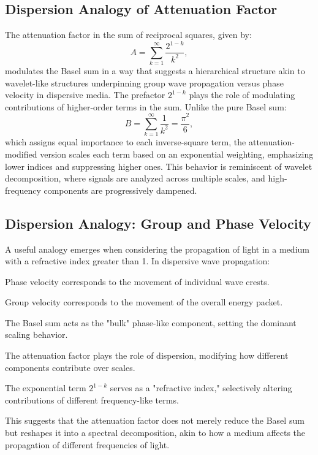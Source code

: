 \subsection*{Dispersion Analogy of Attenuation Factor}
The attenuation factor in the sum of reciprocal squares, given by:
\begin{equation*}
A = \sum_{k=1}^{\infty} \frac{2^{1-k}}{k^2},
\end{equation*}
modulates the Basel sum in a way that suggests a hierarchical structure akin to wavelet-like structures underpinning group wave propagation versus phase velocity in dispersive media. The prefactor $2^{1-k}$ plays the role of modulating contributions of higher-order terms in the sum. Unlike the pure Basel sum:
\begin{equation*}
B = \sum_{k=1}^{\infty} \frac{1}{k^2} = \frac{\pi^2}{6},
\end{equation*}
which assigns equal importance to each inverse-square term, the attenuation-modified version scales each term based on an exponential weighting, emphasizing lower indices and suppressing higher ones. This behavior is reminiscent of wavelet decomposition, where signals are analyzed across multiple scales, and high-frequency components are progressively dampened.

\subsection*{Dispersion Analogy: Group and Phase Velocity}

A useful analogy emerges when considering the propagation of light in a medium with a refractive index greater than 1. In dispersive wave propagation:

Phase velocity corresponds to the movement of individual wave crests.

Group velocity corresponds to the movement of the overall energy packet.

The Basel sum acts as the "bulk" phase-like component, setting the dominant scaling behavior.

The attenuation factor plays the role of dispersion, modifying how different components contribute over scales.

The exponential term $2^{1-k}$ serves as a "refractive index," selectively altering contributions of different frequency-like terms.

This suggests that the attenuation factor does not merely reduce the Basel sum but reshapes it into a spectral decomposition, akin to how a medium affects the propagation of different frequencies of light.

